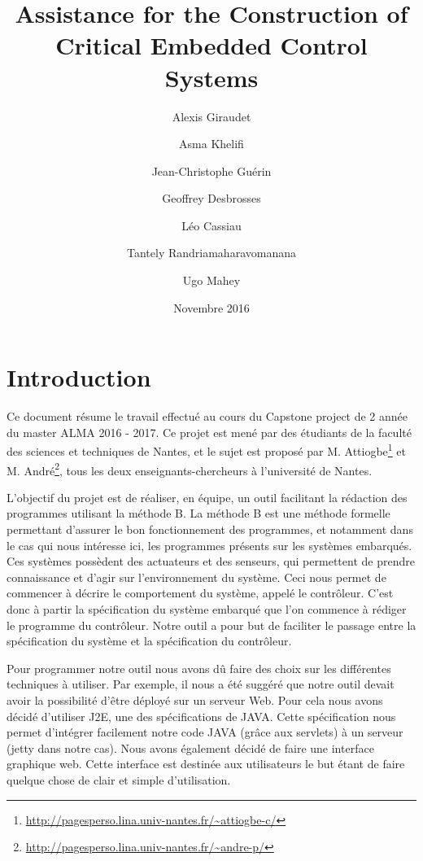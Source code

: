 \documentclass{article}
\title{Assistance for the Construction of Critical Embedded Control Systems}
\author{Alexis Giraudet \and Asma Khelifi \and Jean-Christophe Guérin \and Geoffrey Desbrosses \and Léo Cassiau \and Tantely Randriamaharavomanana \and Ugo Mahey}
\date{Novembre 2016}
\begin{document}
\maketitle

\tableofcontents

\newpage

\section*{Introduction}
    
    Ce document résume le travail effectué au cours du Capstone project de 2\ieme{} année du master ALMA 2016 - 2017. Ce projet est mené par des étudiants de la faculté des sciences et techniques de Nantes, et le sujet est proposé par M. Attiogbe\footnote{\url{http://pagesperso.lina.univ-nantes.fr/~attiogbe-c/}} et M. André\footnote{\url{http://pagesperso.lina.univ-nantes.fr/~andre-p/}}, tous les deux enseignants-chercheurs à l'université de Nantes.
    
    \bigskip
    
    L'objectif du projet est de réaliser, en équipe, un outil facilitant la rédaction des programmes utilisant la méthode B. La méthode B est une méthode formelle permettant d'assurer le bon fonctionnement des programmes, et notamment dans le cas qui nous intéresse ici, les programmes présents sur les systèmes embarqués. Ces systèmes possèdent des actuateurs et des senseurs, qui permettent de prendre connaissance et d'agir sur l'environnement du système. Ceci nous permet de commencer à décrire le comportement du système, appelé le contrôleur. C'est donc à partir la spécification du système embarqué que l'on commence à rédiger le programme du contrôleur. Notre outil a pour but de faciliter le passage entre la spécification du système et la spécification du contrôleur.
    
    \bigskip
    
    Pour programmer notre outil nous avons dû faire des choix sur les différentes techniques à utiliser. Par exemple, il nous a été suggéré que notre outil devait avoir la possibilité d'être déployé sur un serveur Web. Pour cela nous avons décidé d'utiliser J2E, une des spécifications de JAVA. Cette spécification nous permet d'intégrer facilement notre code JAVA (grâce aux servlets) à un serveur (jetty dans notre cas).%
    Nous avons également décidé de faire une interface graphique web. Cette interface est destinée aux utilisateurs le but étant de faire quelque chose de clair et simple d'utilisation.%
    
\end{document}
